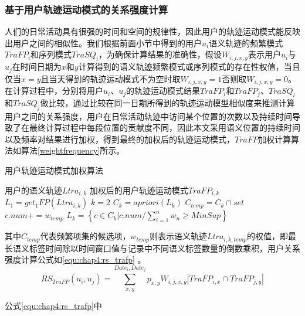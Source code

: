 \subsubsection{基于用户轨迹运动模式的关系强度计算}
人们的日常活动具有很强的时间和空间的规律性，因此用户的轨迹运动模式能反映出用户之间的相似性。我们根据前面小节中得到的用户$u_{i}$语义轨迹的频繁模式$TraFP_{i}$和序列模式$TraSQ_{i}$，为确保计算结果的准确性，假设$W_{i,j,x,y}$表示用户$u_{i}$与$u_{j}$在时间日期为$x$和$y$计算得到的语义轨迹频繁模式或序列模式的存在性权值，当且仅当$x=y$且当天得到的轨迹运动模式不为空时取$W_{i,j,x,y}=1$否则取$W_{i,j,x,y}=0$。在计算过程中，分别将用户$u_{i}$、$u_{j}$的轨迹运动模式结果$TraFP_{i}$和$TraFP_{j}$、$TraSQ_{i}$和$TraSQ_{j}$做比较，通过比较在同一日期所得到的轨迹运动模型相似度来推测计算用户之间的关系强度，用户在日常活动轨迹中访问某个位置的次数以及持续时间导致了在最终计算过程中每段位置的贡献度不同，因此本文采用语义位置的持续时间以及频率对结果进行加权，得到最终的加权后的轨迹运动模式，$TraFP$加权计算算法如算法\ref{weightfrequency}所示。
\begin{algorithm}[H]
    \caption{用户轨迹运动模式加权算法}
    \label{weightfrequency}
    \begin{algorithmic}[1] %
    \REQUIRE 用户的语义轨迹$Ltra_{i,k}$
    \ENSURE 加权后的用户轨迹运动模式$TraFP_{i,k}$
    \STATE $L_{1}= get_{1}FP(Ltra_{i,k})$
    \STATE $k=2$
    \STATE $C_{k}=apriori(L_{k})$
    \STATE $C_{temp}=C_{k}\cap set$
    \STATE $c.num+=w_{temp}$
    \ENDFOR
    \ENDFOR	
    \STATE \mbox{{$L_{k} = \left \{   c\in C_{k}  |  c.num /\sum_{i=1}^{n}w_{n} \geq MinSup  \right \}$ }}
    \ENDWHILE
    \STATE {}			
\end{algorithmic}
\end{algorithm}
\par 其中$C_{temp}$代表频繁项集的候选项，$w_{temp}$则表示语义轨迹$Ltra_{i,k,temp}$的权值，即最长语义标签时间除以时间窗口值与记录中不同语义标签数量的倒数乘积，用户关系强度计算公式如\ref{equ:chap4:rs_trafp} 。
\begin{equation}
\label{equ:chap4:rs_trafp}
RS_{TraFP}(u_{i},u_{j})=\sum_{x ,y }^{ Date_{i}, Date_{j}} p_{x,y} W_{i,j,x,y} \left |TraFP_{i,x} \cap TraFP_{j,y}   \right |
\end{equation}
\par 公式\ref{equ:chap4:rs_trafp}中

